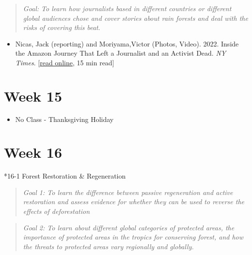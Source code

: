 \documentclass[
  10pt,
  letterpaper,
  oneside,
  open=any]{scrbook}
\makeatletter
\let\oldparagraph\paragraph
\renewcommand{\paragraph}{
    \@ifstar
      \xxxParagraphStar
      \xxxParagraphNoStar
  }
\newcommand{\xxxParagraphStar}[1]{\oldparagraph*{#1}\mbox{}}
\newcommand{\xxxParagraphNoStar}[1]{\oldparagraph{#1}\mbox{}}
\providecommand{\tightlist}{%
  \setlength{\itemsep}{0pt}\setlength{\parskip}{0pt}}
\makeatother
\begin{document}
\begin{quote}
\emph{Goal: To learn how journalists based in different countries or
different global audiences chose and cover stories about rain forests
and deal with the risks of covering this beat}.
\end{quote}

\begin{itemize}
\tightlist
\item
  Nicas, Jack (reporting) and Moriyama,Victor (Photos, Video). 2022.
  Inside the Amazon Journey That Left a Journalist and an Activist Dead.
  \emph{NY Times}.
  {[}\href{https://www.nytimes.com/interactive/2022/07/11/world/americas/amazon-murder-dom-phillips-bruno-pereira.html?smid=tw-nytimes&smtyp=cur}{read
  online}, 15 min read{]}
\end{itemize}

\section*{Week 15}\label{week-15}


\begin{itemize}
\tightlist
\item
  No Class - Thanksgiving Holiday
\end{itemize}

\section*{Week 16}\label{week-16}


\paragraph*{16-1 Forest Restoration \&
Regeneration}\label{forest-restoration-regeneration}

\begin{quote}
\emph{Goal 1: To learn the difference between passive regeneration and
active restoration and assess evidence for whether they can be used to
reverse the effects of deforestation}
\end{quote}

\begin{quote}
\emph{Goal 2: To learn about different global categories of protected
areas, the importance of protected areas in the tropics for conserving
forest, and how the threats to protected areas vary regionally and
globally.}
\end{quote}
\end{document}
